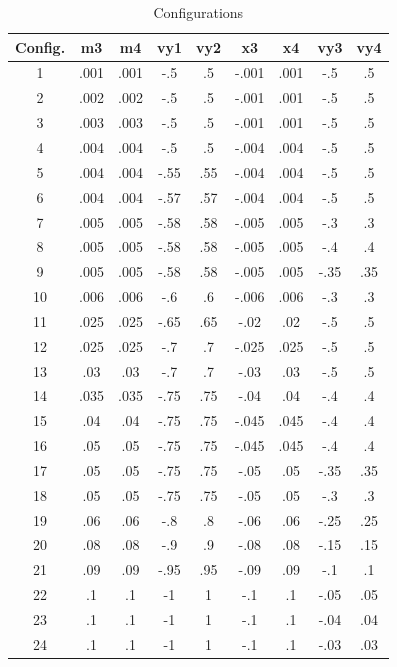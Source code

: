 \documentclass[a4paper,12pt]{article}
\begin{document}
\begin{table}[ht!]
  \centering
  \caption{Configurations}
  \label{tab:variables}
  \begin{tabular}{ccccccccc}
   Config. & m3 & m4 & vy1 & vy2 & x3 & x4 & vy3 & vy4\\
    \hline
   1 & .001 & .001 & -.5 & .5 & -.001 & .001 & -.5 & .5\\
   2 & .002 & .002 & -.5 & .5 & -.001 & .001 & -.5 & .5\\
   3 & .003 & .003 & -.5 & .5 & -.001 & .001 & -.5 & .5\\
   4 & .004 & .004 & -.5 & .5 & -.004 & .004 & -.5 & .5\\
   5 & .004 & .004 & -.55 & .55 & -.004 & .004 & -.5 & .5\\
   6 & .004 & .004 & -.57 & .57 & -.004 & .004 & -.5 & .5\\
   7 & .005 & .005 & -.58 & .58 & -.005 & .005 & -.3 & .3\\
   8 & .005 & .005 & -.58 & .58 & -.005 & .005 & -.4 & .4\\
   9 & .005 & .005 & -.58 & .58 & -.005 & .005 & -.35 & .35\\
   10 & .006 & .006 & -.6 & .6 & -.006 & .006 & -.3 & .3\\
   11 & .025 & .025 & -.65 & .65 & -.02 & .02 & -.5 & .5\\
   12 & .025 & .025 & -.7 & .7 & -.025 & .025 & -.5 & .5\\
   13 & .03 & .03 & -.7 & .7 & -.03 & .03 &-.5 & .5\\
   14 & .035 & .035 & -.75 & .75 & -.04 & .04 &-.4 & .4\\
   15 & .04 & .04 & -.75 & .75 & -.045 & .045 &-.4 & .4\\
   16 & .05 & .05 & -.75 & .75 & -.045 & .045 &-.4 & .4\\
   17 & .05 & .05 & -.75 & .75 & -.05 & .05 &-.35 & .35\\
   18 & .05 & .05 & -.75 & .75 & -.05 & .05 &-.3 & .3\\
   19 & .06 & .06 & -.8 & .8 & -.06 & .06 &-.25 & .25\\
   20 & .08 & .08 & -.9 & .9 & -.08 & .08 &-.15 & .15\\
   21 & .09 & .09 & -.95 & .95 & -.09 & .09 &-.1 & .1\\
   22 & .1 & .1 & -1 & 1 & -.1 & .1 & -.05 & .05\\
   23 & .1 & .1 & -1 & 1 & -.1 & .1 & -.04 & .04\\
   24 & .1 & .1 & -1 & 1 & -.1 & .1 & -.03 & .03\\

\end{tabular}
\end{table}
\end{document}
